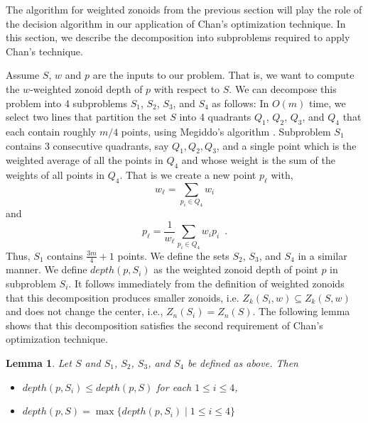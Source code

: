 \documentclass{elsart}
\newtheorem{lemma}{Lemma}
\begin{document}
The algorithm for weighted zonoids from the previous section will play
the role of the decision algorithm in our application of Chan's
optimization technique.  In this section, we describe the
decomposition into subproblems required to apply Chan's technique.

Assume $S$, $w$ and $p$ are the inputs to our problem.  That is, we
want to compute the $w$-weighted zonoid depth of $p$ with respect to
$S$.   We can decompose this problem into 4 subproblems $S_1$, $S_2$,
$S_3$, and $S_4$ as follows: In $O(m)$ time, we select two lines that
partition the set $S$ into 4 quadrants $Q_1$, $Q_2$, $Q_3$, and $Q_4$
that each contain roughly $m/4$ points, using Megiddo's algorithm
\cite{partitioning_with_two_lines_in_the_plane}. Subproblem $S_1$
contains 3 consecutive quadrants, say $Q_1, Q_2, Q_3$, and a single
point which is the weighted average of all the points in $Q_4$ and
whose weight is the sum of the weights of all points in $Q_4$.  That
is we create a new point $p_\ell$ with, 
\[
     w_\ell = \sum_{p_i\in Q_4} w_i
\]
and
\[
     p_\ell = \frac{1}{w_\ell}\sum_{p_i\in Q_4} w_ip_i \enspace .
\]
Thus, $S_1$ contains $\frac{3m}{4}+1$ points. We define the sets
$S_2$, $S_3$, and $S_4$ in a similar manner.  We define $depth(p,S_i)$
as the weighted zonoid depth of point $p$ in subproblem $S_i$. It follows
immediately from the definition of weighted zonoids that 
this decomposition produces smaller zonoids, i.e.
$Z_k(S_i,w) \subseteq Z_k(S,w)$ and does not change the center, i.e.,
$Z_n(S_i)=Z_n(S)$.  The following lemma shows that this
decomposition satisfies the second requirement of Chan's optimization
technique.

\begin{lemma}\label{lemma_final} Let $S$ and $S_1$, $S_2$, $S_3$, and
$S_4$ be defined as above.  Then
\begin{itemize} \item[a.]
$depth(p,S_i) \le depth(p,S)$ for each $1 \le i \le 4$, \item[b.]
$depth(p,S) = \max\{depth(p,S_i) \mid 1 \le i \le 4\}$ \end{itemize}
\end{lemma}
\end{document}
